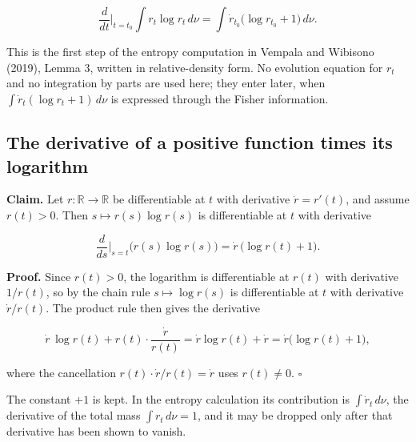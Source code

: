 \documentclass[11pt,a4paper]{report}
\begin{document}
\[\frac{d}{dt}\Big|_{t=t_0}\int r_t\log r_t\,d\nu=\int\dot r_{t_0}\bigl(\log r_{t_0}+1\bigr)\,d\nu.\]


This is the first step of the entropy computation in Vempala and Wibisono (2019), Lemma 3, written in relative-density form. No evolution equation for \(r_t\) and no integration by parts are used here; they enter later, when \(\int\dot r_t(\log r_t+1)\,d\nu\) is expressed through the Fisher information.

\subsection{\texorpdfstring{The derivative of a positive function times its logarithm}{The derivative of a positive function times its logarithm}}
\label{report-step-UnadjustedLangevin-LSI-EntropyDerivative-lean-1}


\textbf{Claim.} Let \(r:\mathbb R\to\mathbb R\) be differentiable at \(t\) with derivative \(\dot r=r'(t)\), and assume \(r(t)>0\). Then \(s\mapsto r(s)\log r(s)\) is differentiable at \(t\) with derivative


\[\frac{d}{ds}\Big|_{s=t}\bigl(r(s)\log r(s)\bigr)=\dot r\,\bigl(\log r(t)+1\bigr).\]


\textbf{Proof.} Since \(r(t)>0\), the logarithm is differentiable at \(r(t)\) with derivative \(1/r(t)\), so by the chain rule \(s\mapsto\log r(s)\) is differentiable at \(t\) with derivative \(\dot r/r(t)\). The product rule then gives the derivative


\[\dot r\,\log r(t)+r(t)\cdot\frac{\dot r}{r(t)}=\dot r\log r(t)+\dot r=\dot r\bigl(\log r(t)+1\bigr),\]


where the cancellation \(r(t)\cdot\dot r/r(t)=\dot r\) uses \(r(t)\neq0\). \(\square\)




The constant \(+1\) is kept. In the entropy calculation its contribution is \(\int\dot r_t\,d\nu\), the derivative of the total mass \(\int r_t\,d\nu=1\), and it may be dropped only after that derivative has been shown to vanish.
\end{document}
